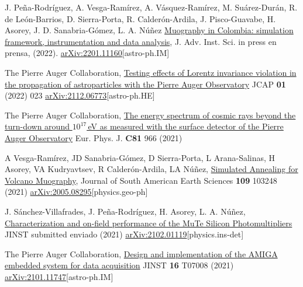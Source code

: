 \begin{etaremune}
\item {} J. Peña-Rodríguez, A. Vesga-Ramírez, A. Vásquez-Ramírez, M. Suárez-Durán, R. de León-Barrios, D. Sierra-Porta, R. Calderón-Ardila, J. Pisco-Guavabe, H. Asorey, J. D. Sanabria-Gómez, L. A. Núñez \href{}{Muography in Colombia: simulation framework, instrumentation and data analysis}, J. Adv. Inst. Sci. \ifeng in press \else en prensa\fi, (2022). \href{ http://arxiv.org/abs/2201.11160}{arXiv:2201.11160}[astro-ph.IM]


\item {}The Pierre Auger Collaboration, \href{https://doi.org/10.1088/1475-7516/2022/01/023}{Testing effects of Lorentz invariance violation in the propagation of astroparticles with the Pierre Auger Observatory} JCAP {\bf{01}} (2022) 023 \href{https://arxiv.org/abs/2112.06773}{arXiv:2112.06773}[astro-ph.HE]

\item {}The Pierre Auger Collaboration, \href{https://doi.org/10.1140/epjc/s10052-021-09700-w}{The energy spectrum of cosmic rays beyond the turn-down around $10^{17}$\,eV as measured with the surface detector of the Pierre Auger Observatory} Eur. Phys. J. {\bf{C81}} 966 (2021)

\item {} A Vesga-Ramírez, JD Sanabria-Gómez, D Sierra-Porta, L Arana-Salinas, H Asorey, VA Kudryavtsev, R Calderón-Ardila, LA Núñez, \href{https://doi.org/10.1016/j.jsames.2021.103248}{Simulated Annealing for Volcano Muography}, Journal of South American Earth Sciences {\bf{109}} 103248 (2021) \href{https://arxiv.org/abs/2005.08295}{arXiv:2005.08295}[physics.geo-ph]

\item {} J. Sánchez-Villafrades, J. Peña-Rodríguez, H. Asorey, L. A. Núñez, \href{}{Characterization and on-field performance of the MuTe Silicon Photomultipliers} JINST \ifeng submitted \else enviado \fi (2021) \href{https://arxiv.org/abs/2102.01119}{arXiv:2102.01119}[physics.ins-det]

\item {}The Pierre Auger Collaboration, \href{https://doi.org/10.1088/1748-0221/16/07/T07008}{Design and implementation of the AMIGA embedded system for data acquisition} JINST {\bf{16}} T07008 (2021) \href{https://arxiv.org/abs/2101.11747}{arXiv:2101.11747}[astro-ph.IM]


\end{etaremune}
